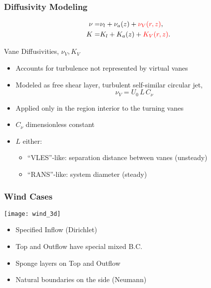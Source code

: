 \documentclass[mathserif]{beamer}
\begin{document}
%
%
%
\begin{frame}
  \frametitle{Diffusivity Modeling}
  
  \begin{eqnarray*}
    \nu =& \nu_{l} + \nu_{a}(z) + \textcolor{red}{\nu_{V}(r,z)}, \\
    K =& K_{l} + K_{a}(z) + \textcolor{red}{K_{V}(r,z)}.
  \end{eqnarray*}
  
  \begin{block}{Vane Diffusivities, $\nu_{V},K_{V}$ }
    \begin{itemize}
    \item Accounts for turbulence not represented by virtual vanes
    \item Modeled as free shear layer, turbulent self-similar circular jet,
      \begin{equation}
        \nu_V = U_0 \, L \, C_{\nu}
      \end{equation}
    \item Applied only in the region interior to the turning vanes
     \item $C_{\nu}$ dimensionless constant
    \item $L$ either: 
\begin{itemize}
 \item ``VLES''-like: separation distance between vanes (unsteady)
 \item ``RANS''-like: system diameter \quad (steady)
\end{itemize}


    \end{itemize}
  \end{block}
  
\end{frame}


%
%
%
\begin{frame}
\frametitle{Wind Cases}

\begin{block}

   \begin{center}
    \texttt{[image: wind\_3d]}
   \end{center}

   \begin{itemize}
   \item Specified Inflow (Dirichlet)
   \item Top and Outflow have special mixed B.C.
   \item Sponge layers on Top and Outflow
   \item Natural boundaries on the side (Neumann)
   \end{itemize}

\end{block}
\end{frame}
\end{document}
